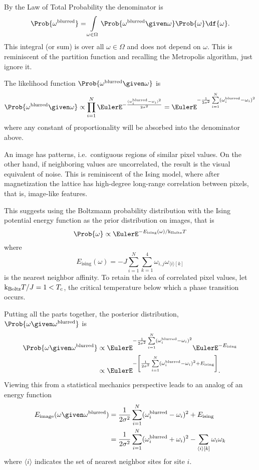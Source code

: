 \documentclass[12pt]{article}
\newcommand{\kT}{{\text k}_{\text{Boltz}}T}
\begin{document}
By the Law of Total Probability the denominator is
\[
    \Prob{ \omega^{\text{blurred}}} = \int\limits_{\omega
    \in \Omega} \Prob{\omega^{\text{blurred}} \given \omega} \Prob{\omega}
    \df{\omega}.
\] This integral (or sum) is over all \( \omega \in \Omega \) and does
not depend on \( \omega \).  This is reminiscent of the partition
function and recalling the Metropolis algorithm, just ignore it.

The likelihood function \( \Prob{\omega^{\text{blurred}} \given \omega} \)
is%
\[
    \Prob{\omega^{\text{blurred}} \given \omega} \propto \prod_{i=1}^N
    \EulerE^{-\frac{ (\omega_i^{\text{blurred}} - \omega_i)^2}{2 \sigma^2}}
    = \EulerE^{ -\frac{1}{2\sigma^2} \sum\limits_{i=1}^N (\omega_i^{\text
    {blurred}} - \omega_i)^2}
\] where any constant of proportionality will be absorbed into the
denominator above.

An image has patterns, i.e.\ contiguous regions of similar
pixel values.  On the other hand, if neighboring values are
uncorrelated, the result is the visual equivalent of noise.  This is
reminiscent of the Ising model, where after magnetization the lattice
has high-degree long-range correlation between pixels, that is,
image-like features.

This suggests using the Boltzmann probability distribution with the
Ising potential energy function as the prior distribution on images, that is
\[
    \Prob{\omega} \propto \EulerE^{-E_{\text{ising}}(\omega)/\kT}
  \] where
\[
    E_{\text{ising}}(\omega) = -J \sum\limits_{i=1}^{N} \sum\limits_{k=1}^4 \omega_{i,
    j} \omega_{\langle i\rangle[k]} 
\] is the nearest neighbor affinity.
To retain the idea of correlated pixel values, let \( \kT/J = 1 < T_c \),
the critical temperature below which a phase transition occurs.

Putting all the parts together, the posterior distribution, \( \Prob{\omega
\given \omega^{\text{blurred}}} \) is
\begin{align*}
    \Prob{\omega \given \omega^{\text{blurred}}} &\propto \EulerE^{-\frac
    {1}{2\sigma^2 } \sum\limits_{i=1}^N(\omega_i^{\text{blurred}} -
    \omega_i)^{2}} \EulerE^{-E_{\text{ising}}} \\
    &\propto \EulerE^{-\left[ \frac{1}{2\sigma^2 } \sum\limits_{i=1}^N(\omega_i^
    {\text{blurred}} - \omega_i)^{2} + E_{\text{ising}}  \right] }.
\end{align*}
Viewing this from a
statistical mechanics perspective leads to an analog of an energy
function
\begin{align*}
    E_{\text{image}}(\omega \given \omega^{\text{blurred}}) &= \frac{1}{2\sigma^2
      } \sum\limits_{i=1}^N(\omega_i^{\text{blurred}} - \omega_i)^{2} +
      E_{\text{ising}} \\
    &= \frac{1}{2\sigma^2 } \sum\limits_{i=1}^N(\omega_i^{\text{blurred}}
    + \omega_i)^{2} - \sum\limits_{\langle i\rangle[k]} \omega_i\omega_k
    \\
\end{align*}
where \( {\langle i\rangle} \) indicates the set of nearest neighbor
sites for site \( i \).
\end{document}
